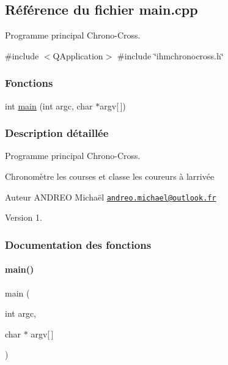 \hypertarget{_chrono-_cross_2main_8cpp}{}\subsection{Référence du fichier main.\+cpp}
\label{_chrono-_cross_2main_8cpp}


Programme principal Chrono-\/\+Cross.  


{\ttfamily \#include $<$Q\+Application$>$}\newline
{\ttfamily \#include \char`\"{}ihmchronocross.\+h\char`\"{}}\newline
\subsubsection*{Fonctions}
\begin{DoxyCompactItemize}
\item 
int \hyperlink{_chrono-_cross_2main_8cpp_ae0665038b72011f5c680c660fcb59459}{main} (int argc, char $\ast$argv\mbox{[}$\,$\mbox{]})
\end{DoxyCompactItemize}


\subsubsection{Description détaillée}
Programme principal Chrono-\/\+Cross. 

Chronomètre les courses et classe les coureurs à l\textquotesingle{}arrivée

\begin{DoxyAuthor}{Auteur}
A\+N\+D\+R\+EO Michaël \href{mailto:andreo.michael@outlook.fr}{\tt andreo.\+michael@outlook.\+fr}
\end{DoxyAuthor}
\begin{DoxyVersion}{Version}
1. 
\end{DoxyVersion}


\subsubsection{Documentation des fonctions}
\mbox{\label{_chrono-_cross_2main_8cpp_ae0665038b72011f5c680c660fcb59459}} 
\paragraph{\texorpdfstring{main()}{main()}}
{\footnotesize\ttfamily main (\begin{DoxyParamCaption}\item[{int}]{argc,  }\item[{char $\ast$}]{argv\mbox{[}$\,$\mbox{]} }\end{DoxyParamCaption})}


